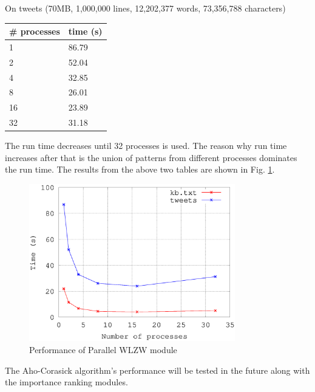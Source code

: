 \documentclass{article}
\begin{document}
On tweets (70MB, 1,000,000 lines, 12,202,377 words, 73,356,788 characters)

\begin{tabular}{|l|l|}
\hline
\# processes& time (s) \\
\hline
1&  86.79  \\
\hline
2&  52.04 \\
\hline
4&  32.85 \\
\hline
8&  26.01 \\
\hline
16&  23.89 \\
\hline
32&  31.18 \\
\hline
\end{tabular}

The run time decreases until 32 processes is used. The reason why run time increases after that is the union of patterns from different processes dominates the run time. The results from the above two tables are shown in Fig. \ref{time}.

\begin{figure}
\centering
\label{time}
\caption{Performance of Parallel WLZW module}
\includegraphics[width=0.8\textwidth]{time}
\end{figure}

The Aho-Corasick algorithm's performance will be tested in the future along with the importance ranking modules.
\end{document}
